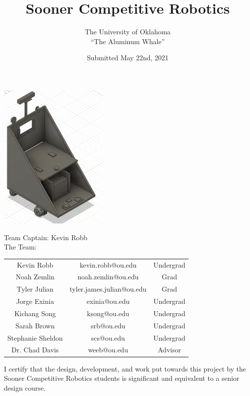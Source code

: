 \documentclass[a4paper, amsfonts, amssymb, amsmath, reprint, showkeys, nofootinbib, 12pt]{article} %
\begin{document}
\title{Sooner Competitive Robotics}
\author{The University of Oklahoma \\ ``The Aluminum Whale''}
\date{Submitted May 22nd, 2021}

\maketitle

\centering
\includegraphics[width=0.4\textwidth]{images/frame/frame4.PNG}

\begin{center}
Team Captain: Kevin Robb \\
The Team: \\
\vspace{.2in}
\begin{tabular}{|c c c|}
    \hline
    Kevin Robb & kevin.robb@ou.edu & Undergrad \\
    Noah Zemlin & noah.zemlin@ou.edu & Grad \\
    Tyler Julian & tyler.james.julian@ou.edu & Grad \\
    Jorge Exinia & exinia@ou.edu & Undergrad \\
    Kichang Song & ksong@ou.edu & Undergrad \\
    Sarah Brown & srb@ou.edu & Undergrad \\
    Stephanie Sheldon & scs@ou.edu & Undergrad \\
    \hline
    Dr. Chad Davis & weeb@ou.edu & Advisor \\
    \hline
\end{tabular}
\end{center}

{ %
\noindent
I certify that the design, development, and work put towards this project by the Sooner Competitive Robotics students is significant and equivalent to a senior design course.
}
\end{document}
